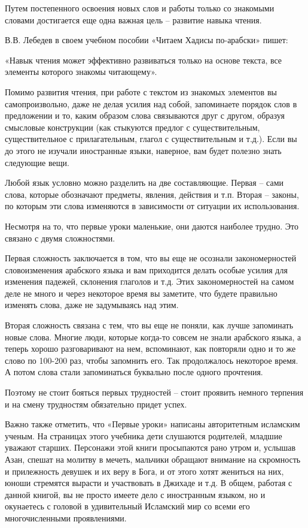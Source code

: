 \documentclass[a5paper]{article}
\begin{document}
Путем постепенного освоения новых слов и работы только со знакомыми словами достигается еще одна важная цель – развитие навыка чтения.

В.В. Лебедев в своем учебном пособии «Читаем Хадисы по-арабски» пишет:

«Навык чтения может эффективно развиваться только на основе текста, все элементы которого знакомы читающему». 

Помимо развития чтения, при работе с текстом из знакомых элементов вы самопроизвольно, даже не делая усилия над собой, запоминаете порядок слов в предложении и то, каким образом слова связываются друг с другом, образуя смысловые конструкции (как стыкуются предлог с существительным, существительное с прилагательным, глагол с существительным и т.д.). Если вы до этого не изучали иностранные языки, наверное, вам будет полезно знать следующие вещи.

Любой язык условно можно разделить на две составляющие. Первая – сами слова, которые обозначают предметы, явления, действия и т.п. Вторая – законы, по которым эти слова изменяются в зависимости от ситуации их использования. 

Несмотря на то, что первые уроки маленькие, они даются наиболее трудно. Это связано с двумя сложностями. 

Первая сложность заключается в том, что вы еще не осознали закономерностей словоизменения арабского языка и вам приходится делать особые усилия для изменения падежей, склонения глаголов и т.д. Этих закономерностей на самом деле не много и через некоторое время вы заметите, что будете правильно изменять слова, даже не задумываясь над этим.

Вторая сложность связана с тем, что вы еще не поняли, как лучше запоминать новые слова. Многие люди, которые когда-то совсем не знали арабского языка, а теперь хорошо разговаривают на нем, вспоминают, как повторяли одно и то же слово по 100-200 раз, чтобы запомнить его. Так продолжалось некоторое время. А потом слова стали запоминаться буквально после одного прочтения. 

Поэтому не стоит бояться первых трудностей – стоит проявить немного терпения и на смену трудностям обязательно придет успех.

Важно также отметить, что «Первые уроки» написаны авторитетным исламским ученым. На страницах этого учебника дети слушаются родителей, младшие уважают старших. Персонажи этой книги просыпаются рано утром и, услышав Азан, спешат на молитву в мечеть, мальчики обращают внимание на скромность и прилежность девушек и их веру в Бога, и от этого хотят жениться на них, юноши стремятся вырасти и участвовать в Джихаде и т.д. В общем, работая с данной книгой, вы не просто имеете дело с иностранным языком, но и окунаетесь с головой в удивительный Исламский мир со всеми его многочисленными проявлениями.
\end{document}
